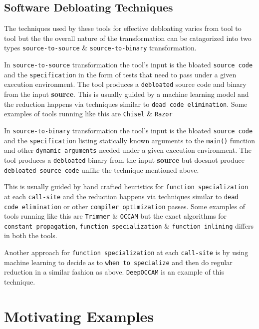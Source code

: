 \documentclass{relatorio}
\begin{document}
\subsection{Software Debloating Techniques}%

The techniques used by these tools for effective debloating varies from tool to tool but the the overall nature of the transformation can be catagorized into two types \texttt{source-to-source} \& \texttt{source-to-binary} transformation. 

In \texttt{source-to-source} transformation the tool's input is the bloated \texttt{source code} and the \texttt{specification} in the form of tests that need to pass under a given execution environment. The tool produces a \texttt{debloated} source code and binary from the input \textbf{source}. This is usually guided by a machine learning model and the reduction happens via techniques similar to \texttt{dead code elimination}. Some examples of tools running like this are \texttt{Chisel} \& \texttt{Razor}
 
In \texttt{source-to-binary} transformation the tool's input is the bloated \texttt{source code} and the \texttt{specification} listing statically known arguments to the \texttt{main()} function and other \texttt{dynamic arguments} needed under a given execution environment. The tool produces a \texttt{debloated} binary from the input \textbf{source} but doesnot produce \texttt{debloated source code} unlike the technique mentioned above. 

This is usually guided by hand crafted heuristics for \texttt{function specialization} at each \texttt{call-site} and the reduction happens via techniques similar to \texttt{dead code elimination} or other \texttt{compiler optimization} passes. Some examples of tools running like this are \texttt{Trimmer} \& \texttt{OCCAM} but the exact algorithms for \texttt{constant propagation}, \texttt{function specialization} \& \texttt{function inlining} differs in both the tools. 

Another approach for \texttt{function specialization} at each \texttt{call-site} is by using machine learning to decide as to \texttt{when to specialize} and then do regular reduction in a similar fashion as above. \texttt{DeepOCCAM} is an example of this technique. 

\section{Motivating Examples}%
\end{document}
